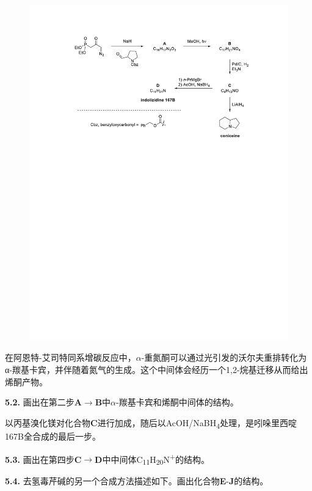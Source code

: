 \begin{figure}[h]
	\centering
	\includegraphics[width=14cm]{./pic/t5-2.pdf}
\end{figure}

在阿恩特-艾司特同系增碳反应中，$\alpha$-重氮酮可以通过光引发的沃尔夫重排转化为α-羰基卡宾，并伴随着氮气的生成。这个中间体会经历一个1,2-烷基迁移从而给出烯酮产物。

\noindent\textbf{5.2.}
画出在第二步\textbf{A}$\rightarrow$\textbf{B}中$\alpha$-羰基卡宾和烯酮中间体的结构。

以丙基溴化镁对化合物\textbf{C}进行加成，随后以AcOH/NaBH\textsubscript{4}处理，是吲哚里西啶167B全合成的最后一步。

\noindent\textbf{5.3.}
画出在第四步\textbf{C}$\rightarrow$\textbf{D}中中间体C\textsubscript{11}H\textsubscript{20}N\textsuperscript{+}的结构。

\noindent\textbf{5.4.}
去氢毒芹碱的另一个合成方法描述如下。画出化合物\textbf{E}-\textbf{J}的结构。

